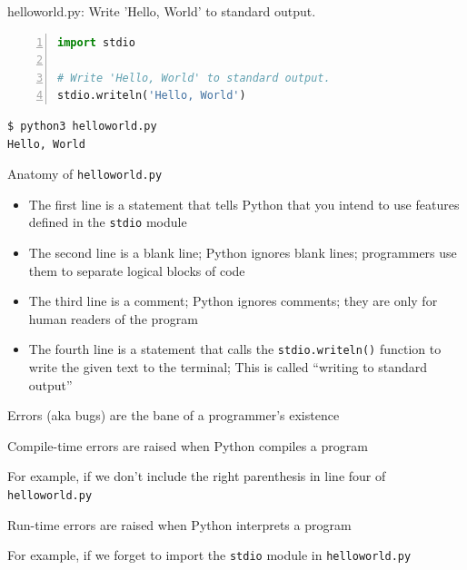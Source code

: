 \documentclass[8pt,a4paper,compress]{beamer}
\begin{document}
\begin{frame}[fragile]
\pause

\begin{framed}
\tiny helloworld.py: Write 'Hello, World' to standard output.
\end{framed}

\begin{lstlisting}[language=Python,numbers=left]
import stdio

# Write 'Hello, World' to standard output.
stdio.writeln('Hello, World')
\end{lstlisting}

\pause

\begin{lstlisting}[language={}]
$ python3 helloworld.py 
Hello, World
\end{lstlisting}

\pause
\bigskip

Anatomy of \lstinline{helloworld.py}
\begin{itemize}
\item The first line is a statement that tells Python that you intend to use features defined in the \lstinline{stdio} module
 
\item The second line is a blank line; Python ignores blank lines; programmers use them to separate logical blocks of code

\item The third line is a comment; Python ignores comments; they are only for human readers of the program

\item The fourth line is a statement that calls the \lstinline{stdio.writeln()} function to write the given text to the terminal; This is called ``writing to standard output''
\end{itemize}
\end{frame}

\begin{frame}[fragile]
\pause

Errors (aka bugs) are the bane of a programmer's existence

\pause
\bigskip

Compile-time errors are raised when Python compiles a program

\pause
\bigskip

For example, if we don't include the right parenthesis in line four of \lstinline{helloworld.py}

\pause
\bigskip

Run-time errors are raised when Python interprets a program

\pause
\bigskip

For example, if we forget to import the \lstinline{stdio} module in \lstinline{helloworld.py}
\end{frame}
\end{document}
